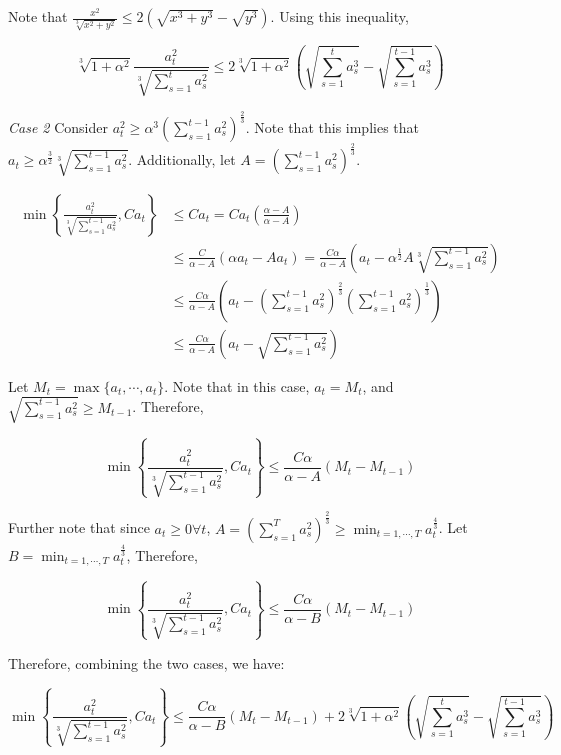 \documentclass{article}
\begin{document}
Note that $\frac{x^2}{\sqrt[3]{x^2 + y^2}} \leq 2(\sqrt{x^3 + y^3} - \sqrt{y^3})$. Using this inequality,

\[
  \sqrt[3]{1 + \alpha^2} \frac{a_{t}^2}{\sqrt[3]{\sum\limits_{s=1}^t a_{s}^2}} \leq 2 \sqrt[3]{1 +
  \alpha^2}\left(\sqrt{\sum\limits_{s=1}^t a_{s}^3} - \sqrt{\sum\limits_{s=1}^{t-1} a_{s}^3}\right)
\]

\emph{Case 2} Consider $a_{t}^2 \geq \alpha^3 \left(\sum\limits_{s=1}^{t-1} a_{s}^2\right)^\frac{2}{3}$. Note that this
implies that $a_t \geq \alpha^\frac{3}{2} \sqrt[3]{\sum\limits_{s=1}^{t-1} a_{s}^2}$. Additionally, let 
$A = \left( \sum\limits_{s=1}^{t-1} a_{s}^2 \right)^\frac{2}{3}$.


\begin{align*}
  \min \left\{ \frac{a_{t}^2}{\sqrt[3]{\sum\limits_{s=1}^{t-1} a_{s}^2}}, C a_t \right\}
  &\leq C a_t = C a_t \left(\frac{\alpha - A}{\alpha -A}\right) \\
  &\leq \frac{C}{\alpha - A}\left(\alpha a_t - A a_t\right) = \frac{C \alpha}{\alpha - A}\left(a_t - \alpha^\frac{1}{2}
    A \sqrt[3]{\sum\limits_{s=1}^{t-1} a_{s}^2}\right) \\
  &\leq \frac{C \alpha}{\alpha - A}\left(a_t - \left( \sum\limits_{s=1}^{t-1} a_{s}^2 \right)^\frac{2}{3}
  \left(\sum\limits_{s=1}^{t-1} a_{s}^2\right)^\frac{1}{3}\right) \\
  &\leq \frac{C \alpha}{\alpha - A}\left(a_t - \sqrt{\sum\limits_{s=1}^{t-1} a_{s}^2}\right)
\end{align*}

Let $M_t = \max \{a_t, \cdots, a_t\}$. Note that in this case, $a_t = M_t$, and $\sqrt{\sum\limits_{s=1}^{t-1} a_{s}^2}
\geq M_{t-1}$. Therefore,

\[
  \min \left\{ \frac{a_{t}^2}{\sqrt[3]{\sum\limits_{s=1}^{t-1} a_{s}^2}}, C a_t \right\} \leq 
  \frac{C \alpha}{\alpha - A}\left(M_t - M_{t-1}\right)
\]

Further note that since $a_t \geq 0 \forall t$, $A = (\sum\limits_{s=1}^T a_{s}^2)^\frac{2}{3} \geq
\min_{t=1,\cdots,T}a_{t}^\frac{4}{3}$. Let $B = \min_{t=1,\cdots,T}a_{t}^\frac{4}{3}$, Therefore,

\[
  \min \left\{ \frac{a_{t}^2}{\sqrt[3]{\sum\limits_{s=1}^{t-1} a_{s}^2}}, C a_t \right\} \leq 
  \frac{C \alpha}{\alpha - B}\left(M_t - M_{t-1}\right)
\]

Therefore, combining the two cases, we have:

\[
  \min \left\{ \frac{a_{t}^2}{\sqrt[3]{\sum\limits_{s=1}^{t-1} a_{s}^2}}, C a_t \right\} \leq \frac{C \alpha}{\alpha -
  B}\left(M_t - M_{t-1}\right) + 2 \sqrt[3]{1 + \alpha^2}\left(\sqrt{\sum\limits_{s=1}^t a_{s}^3} -
  \sqrt{\sum\limits_{s=1}^{t-1} a_{s}^3}\right)
\]
\end{document}
